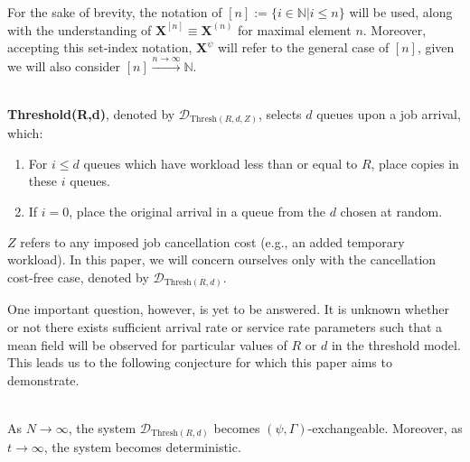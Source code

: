 For the sake of brevity, the notation of $[n] := \{i \in \mathbb{N} | i \leq n\}$ will be used, along with the understanding of $\mathbf{X}^{[n]} \equiv \mathbf{X}^{(n)}$ for maximal element $n$.
Moreover, accepting this set-index notation, $\mathbf{X}^{\psi}$ will refer to the general case of $[n]$, given we will also consider $[n] \overset{n\rightarrow \infty}\longrightarrow \mathbb{N}$.

\begin{definition}[Threshold$(R,d)$]
    \hfill \\
    \textbf{Threshold(R,d)}, denoted by $\mathcal{D}_{\text{Thresh}(R,d,Z)}$, selects $d$ queues upon a job arrival,
    which:
    \begin{enumerate}
        \item For $i \leq d$ queues which have workload less than or equal to $R$, place copies in these $i$ queues.
        \item If $i=0$, place the original arrival in a queue from the $d$ chosen at random.
    \end{enumerate}
    $Z$ refers to any imposed job cancellation cost (e.g., an added temporary workload).
    In this paper, we will concern
    ourselves only with the cancellation cost-free case, denoted by \normalfont $\mathcal{D}_{\text{Thresh}(R,d)}$.
\end{definition}


One important question, however, is yet to be answered.
It is unknown whether or not there exists sufficient arrival rate or service rate parameters such that a mean field will be observed for particular values of $R$ or $d$ in the threshold model.
This leads us to the following conjecture for which this paper aims to demonstrate.
\begin{conjecture}
    \hfill \\
    As $N \longrightarrow \infty$, the system $\mathcal{D}_{\text{Thresh}(R,d)}$ becomes $(\psi, \Gamma)$-exchangeable.
    Moreover, as $t \longrightarrow \infty$, the system becomes deterministic.
    \label{conj}
\end{conjecture}


